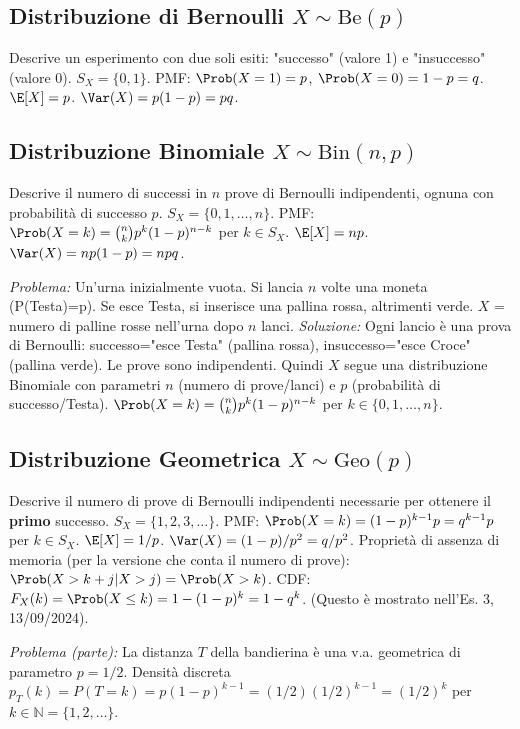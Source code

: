 \subsection{Distribuzione di Bernoulli \texorpdfstring{$X \sim \text{Be}(p)$}{X ~ Be(p)}}
Descrive un esperimento con due soli esiti: "successo" (valore 1) e "insuccesso" (valore 0).
$S_X = \{0, 1\}$.
PMF: $\Prob(X=1) = p$, $\Prob(X=0) = 1-p = q$.
$\E[X] = p$.
$\Var(X) = p(1-p) = pq$.

\subsection{Distribuzione Binomiale \texorpdfstring{$X \sim \text{Bin}(n,p)$}{X ~ Bin(n,p)}}
Descrive il numero di successi in $n$ prove di Bernoulli indipendenti, ognuna con probabilità di successo $p$.
$S_X = \{0, 1, \dots, n\}$.
PMF: $\Prob(X=k) = \binom{n}{k} p^k (1-p)^{n-k}$ per $k \in S_X$.
$\E[X] = np$.
$\Var(X) = np(1-p) = npq$.
\begin{example}
\textit{Problema:} Un'urna inizialmente vuota. Si lancia $n$ volte una moneta (P(Testa)=p). Se esce Testa, si inserisce una pallina rossa, altrimenti verde. $X$ = numero di palline rosse nell'urna dopo $n$ lanci.
\textit{Soluzione:} Ogni lancio è una prova di Bernoulli: successo="esce Testa" (pallina rossa), insuccesso="esce Croce" (pallina verde). Le prove sono indipendenti.
Quindi $X$ segue una distribuzione Binomiale con parametri $n$ (numero di prove/lanci) e $p$ (probabilità di successo/Testa).
$\Prob(X=k) = \binom{n}{k} p^k (1-p)^{n-k}$ per $k \in \{0, 1, \dots, n\}$.
\end{example}

\subsection{Distribuzione Geometrica \texorpdfstring{$X \sim \text{Geo}(p)$}{X ~ Geo(p)}}
Descrive il numero di prove di Bernoulli indipendenti necessarie per ottenere il \textbf{primo} successo.
$S_X = \{1, 2, 3, \dots\}$.
PMF: $\Prob(X=k) = (1-p)^{k-1} p = q^{k-1}p$ per $k \in S_X$.
$\E[X] = 1/p$.
$\Var(X) = (1-p)/p^2 = q/p^2$.
Proprietà di assenza di memoria (per la versione che conta il numero di prove):
$\Prob(X > k+j | X > j) = \Prob(X > k)$.
CDF: $F_X(k) = \Prob(X \le k) = 1 - (1-p)^k = 1 - q^k$. (Questo è mostrato nell'Es. 3, 13/09/2024).

\begin{example}[Esercizio 2, 17/07/2024 - Gioco di Agata]
\textit{Problema (parte):} La distanza $T$ della bandierina è una v.a. geometrica di parametro $p=1/2$. Densità discreta $p_T(k) = P(T=k) = p(1-p)^{k-1} = (1/2)(1/2)^{k-1} = (1/2)^k$ per $k \in \mathbb{N} = \{1, 2, \dots\}$.
\end{example}

